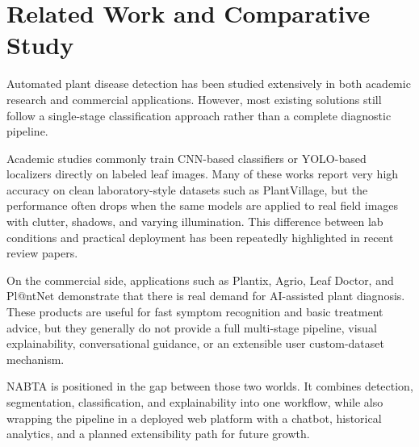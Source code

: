 \section{Related Work and Comparative Study}
\label{sec:intro_related_work}

Automated plant disease detection has been studied extensively in both academic research and commercial applications. However, most existing solutions still follow a single-stage classification approach rather than a complete diagnostic pipeline.

Academic studies commonly train CNN-based classifiers or YOLO-based localizers directly on labeled leaf images. Many of these works report very high accuracy on clean laboratory-style datasets such as PlantVillage, but the performance often drops when the same models are applied to real field images with clutter, shadows, and varying illumination. This difference between lab conditions and practical deployment has been repeatedly highlighted in recent review papers.

On the commercial side, applications such as Plantix, Agrio, Leaf Doctor, and Pl@ntNet demonstrate that there is real demand for AI-assisted plant diagnosis. These products are useful for fast symptom recognition and basic treatment advice, but they generally do not provide a full multi-stage pipeline, visual explainability, conversational guidance, or an extensible user custom-dataset mechanism.

NABTA is positioned in the gap between those two worlds. It combines detection, segmentation, classification, and explainability into one workflow, while also wrapping the pipeline in a deployed web platform with a chatbot, historical analytics, and a planned extensibility path for future growth.

